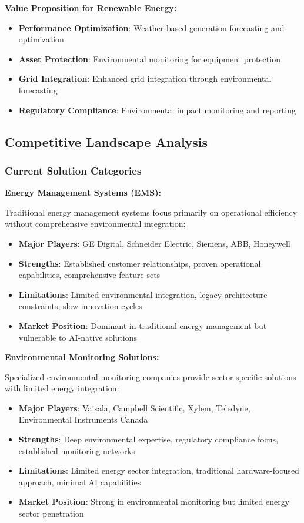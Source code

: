 \textbf{Value Proposition for Renewable Energy:}
\begin{itemize}
    \item \textbf{Performance Optimization}: Weather-based generation forecasting and optimization
    \item \textbf{Asset Protection}: Environmental monitoring for equipment protection
    \item \textbf{Grid Integration}: Enhanced grid integration through environmental forecasting
    \item \textbf{Regulatory Compliance}: Environmental impact monitoring and reporting
\end{itemize}

\subsection{Competitive Landscape Analysis}

\subsubsection{Current Solution Categories}

\textbf{Energy Management Systems (EMS):}

Traditional energy management systems focus primarily on operational efficiency without comprehensive environmental integration:

\begin{itemize}
    \item \textbf{Major Players}: GE Digital, Schneider Electric, Siemens, ABB, Honeywell
    \item \textbf{Strengths}: Established customer relationships, proven operational capabilities, comprehensive feature sets
    \item \textbf{Limitations}: Limited environmental integration, legacy architecture constraints, slow innovation cycles
    \item \textbf{Market Position}: Dominant in traditional energy management but vulnerable to AI-native solutions
\end{itemize}

\textbf{Environmental Monitoring Solutions:}

Specialized environmental monitoring companies provide sector-specific solutions with limited energy integration:

\begin{itemize}
    \item \textbf{Major Players}: Vaisala, Campbell Scientific, Xylem, Teledyne, Environmental Instruments Canada
    \item \textbf{Strengths}: Deep environmental expertise, regulatory compliance focus, established monitoring networks
    \item \textbf{Limitations}: Limited energy sector integration, traditional hardware-focused approach, minimal AI capabilities
    \item \textbf{Market Position}: Strong in environmental monitoring but limited energy sector penetration
\end{itemize}

